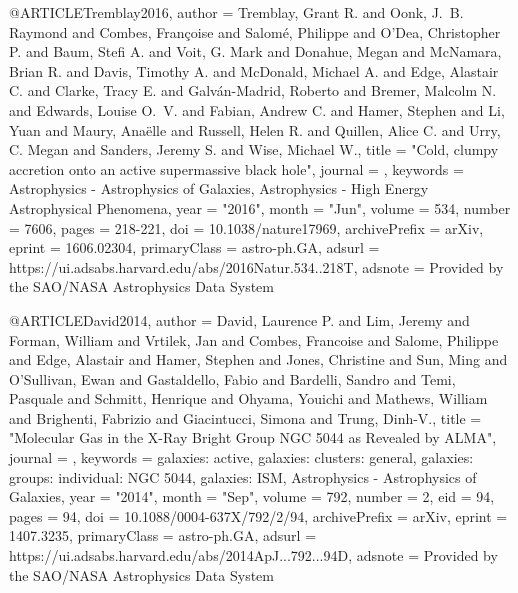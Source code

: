 @ARTICLE{Tremblay2016,
       author = {{Tremblay}, Grant R. and {Oonk}, J.~B. Raymond and
         {Combes}, Fran{\c{c}}oise and {Salom{\'e}}, Philippe and
         {O'Dea}, Christopher P. and {Baum}, Stefi A. and {Voit}, G. Mark and
         {Donahue}, Megan and {McNamara}, Brian R. and {Davis}, Timothy A. and
         {McDonald}, Michael A. and {Edge}, Alastair C. and {Clarke}, Tracy E. and
         {Galv{\'a}n-Madrid}, Roberto and {Bremer}, Malcolm N. and
         {Edwards}, Louise O.~V. and {Fabian}, Andrew C. and {Hamer}, Stephen and
         {Li}, Yuan and {Maury}, Ana{\"e}lle and {Russell}, Helen R. and
         {Quillen}, Alice C. and {Urry}, C. Megan and {Sanders}, Jeremy S. and
         {Wise}, Michael W.},
        title = "{Cold, clumpy accretion onto an active supermassive black hole}",
      journal = {\nat},
     keywords = {Astrophysics - Astrophysics of Galaxies, Astrophysics - High Energy Astrophysical Phenomena},
         year = "2016",
        month = "Jun",
       volume = {534},
       number = {7606},
        pages = {218-221},
          doi = {10.1038/nature17969},
archivePrefix = {arXiv},
       eprint = {1606.02304},
 primaryClass = {astro-ph.GA},
       adsurl = {https://ui.adsabs.harvard.edu/abs/2016Natur.534..218T},
      adsnote = {Provided by the SAO/NASA Astrophysics Data System}
}

@ARTICLE{David2014,
       author = {{David}, Laurence P. and {Lim}, Jeremy and {Forman}, William and
         {Vrtilek}, Jan and {Combes}, Francoise and {Salome}, Philippe and
         {Edge}, Alastair and {Hamer}, Stephen and {Jones}, Christine and
         {Sun}, Ming and {O'Sullivan}, Ewan and {Gastaldello}, Fabio and
         {Bardelli}, Sandro and {Temi}, Pasquale and {Schmitt}, Henrique and
         {Ohyama}, Youichi and {Mathews}, William and {Brighenti}, Fabrizio and
         {Giacintucci}, Simona and {Trung}, Dinh-V.},
        title = "{Molecular Gas in the X-Ray Bright Group NGC 5044 as Revealed by ALMA}",
      journal = {\apj},
     keywords = {galaxies: active, galaxies: clusters: general, galaxies: groups: individual: NGC 5044, galaxies: ISM, Astrophysics - Astrophysics of Galaxies},
         year = "2014",
        month = "Sep",
       volume = {792},
       number = {2},
          eid = {94},
        pages = {94},
          doi = {10.1088/0004-637X/792/2/94},
archivePrefix = {arXiv},
       eprint = {1407.3235},
 primaryClass = {astro-ph.GA},
       adsurl = {https://ui.adsabs.harvard.edu/abs/2014ApJ...792...94D},
      adsnote = {Provided by the SAO/NASA Astrophysics Data System}
}

